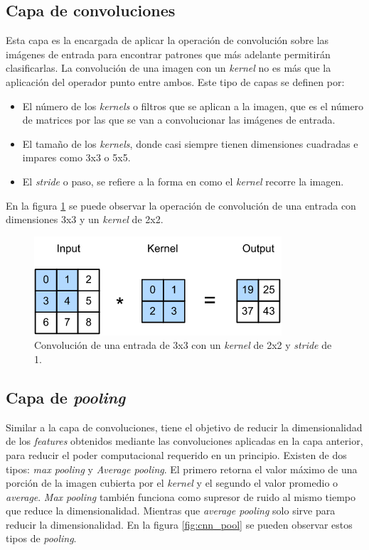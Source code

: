 \subsection{Capa de convoluciones}
Esta capa es la encargada de aplicar la operación de convolución sobre las imágenes de entrada para encontrar patrones que más adelante permitirán clasificarlas. La convolución de una imagen con un \textit{kernel} no es más que la aplicación del operador punto entre ambos. Este tipo de capas se definen por:
\begin{itemize}
	\item El número de los \textit{kernels} o filtros que se aplican a la imagen, que es el número de matrices por las que se van a convolucionar las imágenes de entrada.
	\item El tamaño de los \textit{kernels}, donde casi siempre tienen dimensiones cuadradas e impares como 3x3 o 5x5.
	\item El \textit{stride} o paso, se refiere a la forma en como el \textit{kernel} recorre la imagen.
\end{itemize}

En la figura \ref{fig:cnn_conv} se puede observar la operación de convolución de una entrada con dimensiones 3x3 y un \textit{kernel} de 2x2.

\begin{figure}[h]
	\centering
	\includegraphics[scale=0.7]{./Figures/cnn_conv.png}
	\caption{Convolución de una entrada de 3x3 con un \textit{kernel} de 2x2 y \textit{stride} de 1\protect\footnotemark.}
	\label{fig:cnn_conv}
\end{figure}

\subsection{Capa de \textit{pooling}}
Similar a la capa de convoluciones, tiene el objetivo de reducir la dimensionalidad de los \textit{features} obtenidos mediante las convoluciones aplicadas en la capa anterior, para reducir el poder computacional requerido en un principio. Existen de dos tipos: \textit{max pooling} y \textit{Average pooling}. El primero retorna el valor máximo de una porción de la imagen cubierta por el \textit{kernel} y el segundo el valor promedio o \textit{average}. \textit{Max pooling} también funciona como supresor de ruido al mismo tiempo que reduce la dimensionalidad. Mientras que \textit{average pooling} solo sirve para reducir la dimensionalidad. En la figura \ref{fig:cnn_pool} se pueden observar estos tipos de \textit{pooling}.

